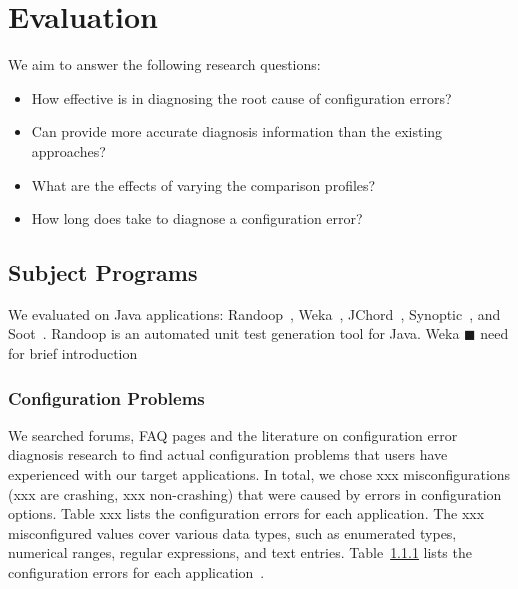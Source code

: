 \section{Evaluation}
\label{sec:evaluation}


We aim to answer the following research questions:

\begin{itemize}
\item How effective is \ourtool in diagnosing the root cause of
configuration errors?
\item Can \ourtool provide more accurate diagnosis information than
the existing approaches? 
\item What are the effects of varying the comparison profiles?
\item How long does \ourtool take to diagnose a configuration error?
\end{itemize}


\subsection{Subject Programs}

We evaluated \ourtool on \subjectnum Java applications: Randoop~\cite{randoop},
Weka~\cite{weka}, JChord~\cite{jchord}, Synoptic~\cite{synoptic},
and Soot~\cite{soot}. Randoop is an automated unit test generation tool
for Java. Weka $\blacksquare$ need for brief introduction

\subsubsection{Configuration Problems}


We searched forums, FAQ pages and the literature on configuration error diagnosis
research to find actual configuration problems that users have experienced with our
target applications. In total, we chose xxx misconfigurations (xxx
are crashing, xxx non-crashing) that were caused by errors in
configuration options. Table xxx lists the configuration errors for each application.
The xxx misconfigured values cover various data types, such as enumerated types,
numerical ranges, regular expressions, and text entries. Table~\ref{} lists
the configuration errors for each application~\cite{tab:subjects}.

